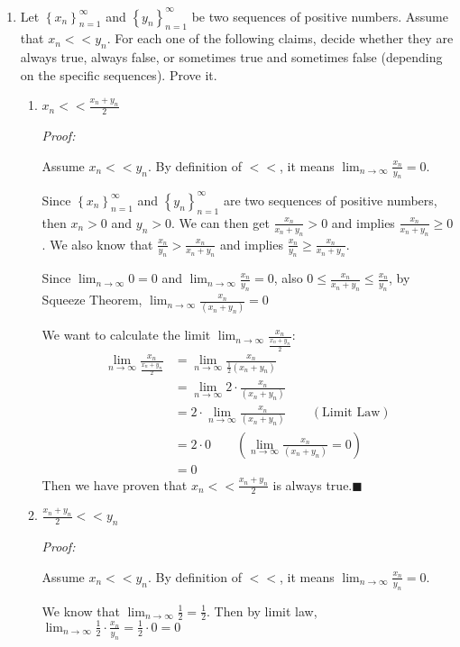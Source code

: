 \documentclass[12pt]{exam}
\newcommand {\DS} [1] {${\displaystyle #1}$}
\newcommand{\vv}{\vspace{.1cm}}
\begin{document}
\begin{enumerate}
\vv

\item Let \DS{\left\{x_n\right\}_{n=1}^{\infty}} and \DS{\left\{y_n\right\}_{n=1}^{\infty}} be two sequences of positive numbers.  Assume that \DS{x_n << y_n}. 
	For each one of the following claims, decide whether they are always true, always false, or sometimes true and sometimes false (depending on the specific sequences).  Prove it.
	\begin{enumerate}
		\item \DS{x_n << \frac{x_n+y_n}{2}}
		
		\emph{Proof:}
		
		Assume $x_n << y_n$. By definition of $<<$, it means $\lim_{n\to\infty}\frac{x_n}{y_n}=0$.
		
		Since \DS{\left\{x_n\right\}_{n=1}^{\infty}} and \DS{\left\{y_n\right\}_{n=1}^{\infty}} are two sequences of positive numbers, then $x_n>0$ and $y_n>0$. We can then get $\frac{x_n}{x_n+y_n}>0$ and implies $\frac{x_n}{x_n+y_n}\geq0$. We also know that $\frac{x_n}{y_n}>\frac{x_n}{x_n+y_n}$ and implies $\frac{x_n}{y_n}\geq\frac{x_n}{x_n+y_n}$.
		
		Since $\lim_{n\to\infty}0=0$ and $\lim_{n\to\infty}\frac{x_n}{y_n}=0$, also $0\leq\frac{x_n}{x_n+y_n}\leq\frac{x_n}{y_n}$, by Squeeze Theorem, $\lim_{n\to\infty}\frac{x_n}{(x_n+y_n)}=0$
		
		We want to calculate the limit $\lim_{n\to\infty}\frac{x_n}{\frac{x_n+y_n}{2}}$:
		\begin{align*}
		    \lim_{n\to\infty}\frac{x_n}{\frac{x_n+y_n}{2}}&=\lim_{n\to\infty}\frac{x_n}{\frac{1}{2}(x_n+y_n)}\\
		    &=\lim_{n\to\infty}2\cdot\frac{x_n}{(x_n+y_n)}\\
		    &=2\cdot\lim_{n\to\infty}\frac{x_n}{(x_n+y_n)}\qquad(\mbox{Limit Law})\\
		    &=2\cdot0\qquad(\lim_{n\to\infty}\frac{x_n}{(x_n+y_n)}=0)\\
		    &=0
		\end{align*}
		Then we have proven that \DS{x_n << \frac{x_n+y_n}{2}} is always true.\qquad$\blacksquare$
		\newpage
		
		\item \DS{\frac{x_n+y_n}{2} << y_n}
		
		\emph{Proof:}
		
		Assume $x_n << y_n$. By definition of $<<$, it means $\lim_{n\to\infty}\frac{x_n}{y_n}=0$.
		
		We know that $\lim_{n\to\infty}\frac{1}{2}=\frac{1}{2}$. Then by limit law, $\lim_{n\to\infty}\frac{1}{2}\cdot\frac{x_n}{y_n}=\frac{1}{2}\cdot0=0$
		

\end{enumerate}
\end{enumerate}
\end{document}
